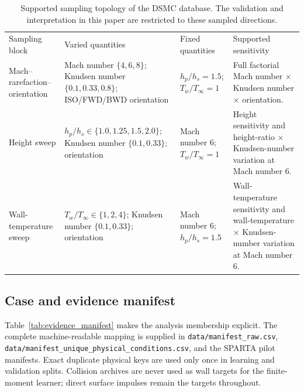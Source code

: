 \documentclass[aip,pof,preprint,floatfix,amsmath,amssymb]{revtex4-2}
\begin{document}
\begin{table}[t]
\centering
\caption{Supported sampling topology of the DSMC database. The validation and interpretation in this paper are restricted to these sampled directions.}
\label{tab:topology}
\small
\begin{ruledtabular}
\begin{tabular}{llll}
Sampling block & Varied quantities & Fixed quantities & Supported sensitivity \\
Mach--rarefaction--orientation & \parbox[t]{0.25\textwidth}{Mach number $\{4,6,8\}$; Knudsen number $\{0.1,0.33,0.8\}$; ISO/FWD/BWD orientation} & \parbox[t]{0.18\textwidth}{$h_p/h_s=1.5$; $T_w/T_\infty=1$} & \parbox[t]{0.25\textwidth}{Full factorial Mach number $\times$ Knudsen number $\times$ orientation.} \\
Height sweep & \parbox[t]{0.25\textwidth}{$h_p/h_s\in\{1.0,1.25,1.5,2.0\}$; Knudsen number $\{0.1,0.33\}$; orientation} & \parbox[t]{0.18\textwidth}{Mach number $6$; $T_w/T_\infty=1$} & \parbox[t]{0.25\textwidth}{Height sensitivity and height-ratio $\times$ Knudsen-number variation at Mach number $6$.} \\
Wall-temperature sweep & \parbox[t]{0.25\textwidth}{$T_w/T_\infty\in\{1,2,4\}$; Knudsen number $\{0.1,0.33\}$; orientation} & \parbox[t]{0.18\textwidth}{Mach number $6$; $h_p/h_s=1.5$} & \parbox[t]{0.25\textwidth}{Wall-temperature sensitivity and wall-temperature $\times$ Knudsen-number variation at Mach number $6$.} \\
\end{tabular}
\end{ruledtabular}
\end{table}

\subsection{Case and evidence manifest}
Table~\ref{tab:evidence_manifest} makes the analysis membership explicit. The complete machine-readable mapping is supplied in \texttt{data/manifest\_raw.csv}, \texttt{data/manifest\_unique\_physical\_conditions.csv}, and the SPARTA pilot manifests. Exact duplicate physical keys are used only once in learning and validation splits. Collision archives are never used as wall targets for the finite-moment learner; direct surface impulses remain the targets throughout.
\end{document}
